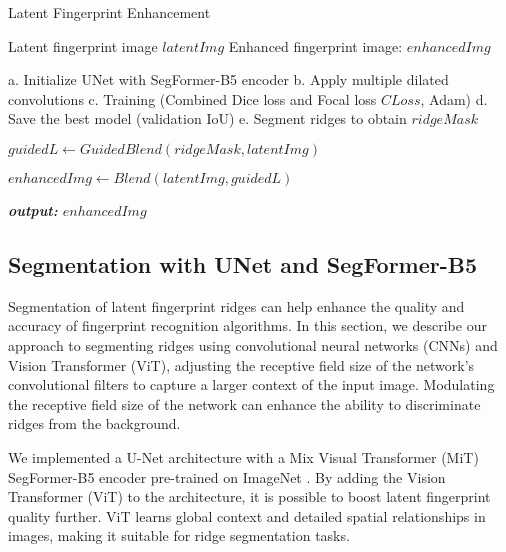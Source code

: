 \documentclass[twocolumn, switch]{article} %
\begin{document}
\begin{algorithm}
\caption{Latent Fingerprint Enhancement}\label{alg:ridge_segmentation_enhancement}
\begin{algorithmic}
\renewcommand{\algorithmicrequire}{\textbf{Input:}}
\Require Latent fingerprint image $latentImg$
\renewcommand{\algorithmicensure}{\textbf{Output:}}
\Ensure Enhanced fingerprint image: $enhancedImg$

\renewcommand{\algorithmicrequire}{\textbf{Step 1: Ridge Segmentation (UNet-SegFormer-B5):}}
\Require

\State \small a. Initialize UNet with SegFormer-B5 encoder
\State \small b. Apply multiple dilated convolutions
\State \small c. Training (Combined Dice loss and Focal loss $CLoss$, Adam)
\State \small d. Save the best model (validation IoU)
\State \small e. Segment ridges to obtain $ridgeMask$

\renewcommand{\algorithmicrequire}{\textbf{Step 2: Final enhancements operations:}}
\Require


\State \small $guidedL \gets GuidedBlend(ridgeMask, latentImg)$

\State \small $enhancedImg \gets Blend(latentImg, guidedL)$


\State \small  \textit{\textbf{output:} $enhancedImg$}
\end{algorithmic}
\end{algorithm}


\subsection{Segmentation with UNet and SegFormer-B5}
\label{unetresnet}

Segmentation of latent fingerprint ridges can help enhance the quality and accuracy of fingerprint recognition algorithms. In this section, we describe our approach to segmenting ridges using convolutional neural networks (CNNs) and Vision Transformer (ViT), adjusting the receptive field size of the network's convolutional filters to capture a larger context of the input image. Modulating the receptive field size of the network can enhance the ability to discriminate ridges from the background.

We implemented a U-Net architecture \cite{ronneberger2015u} with a Mix Visual Transformer (MiT) SegFormer-B5 encoder \cite{DBLP:journals/corr/abs-2105-15203} pre-trained on ImageNet \cite{deng2009imagenet}. By adding the Vision Transformer (ViT) to the architecture, it is possible to boost latent fingerprint quality further. ViT learns global context and detailed spatial relationships in images, making it suitable for ridge segmentation tasks.
\end{document}

